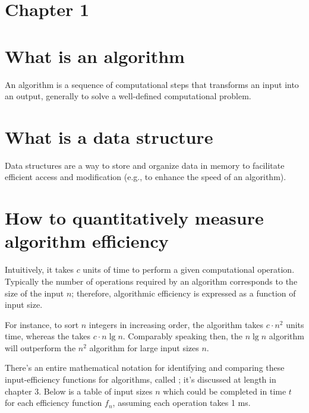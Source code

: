 
\section*{\Huge\bfseries Chapter 1}

\section{What is an algorithm}
An algorithm is a sequence of computational steps that transforms an input into an output, generally to solve a well-defined computational problem.

\section{What is a data structure}
Data structures are a way to store and organize data in memory to facilitate efficient access and modification (e.g., to enhance the speed of an algorithm).

\section{How to quantitatively measure algorithm efficiency}
Intuitively, it takes $c$ units of time to perform a given computational operation. Typically the number of operations required by an algorithm corresponds to the size of the input $n$; therefore, algorithmic efficiency is expressed as a function of input size. 

For instance, to sort $n$ integers in increasing order, the  algorithm takes $c \cdot n^2$ units time, whereas the  takes $c \cdot n \lg n$. Comparably speaking then, the $n \lg n$ algorithm will outperform the $n^2$ algorithm for large input sizes $n$. 

There's an entire mathematical notation for identifying and comparing these input-efficiency functions for algorithms, called ; it's discussed at length in chapter 3. Below is a table of input sizes $n$ which could be completed in time $t$ for each efficiency function $f_n$, assuming each operation takes 1 ms.

